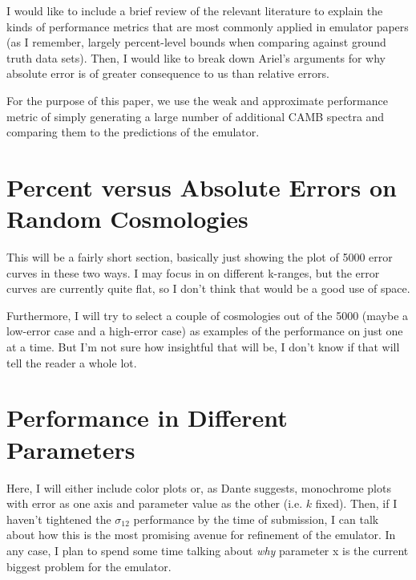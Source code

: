 I would like to include a brief review of the relevant literature to explain the kinds of performance metrics that are most commonly applied in emulator papers (as I remember, largely percent-level bounds when comparing against ground truth data sets). Then, I would like to break down Ariel's arguments for why absolute error is of greater consequence to us than relative errors.

For the purpose of this paper, we use the weak and approximate performance metric of simply generating a large number of additional CAMB spectra and comparing them to the predictions of the emulator.

\section{Percent versus Absolute Errors on Random Cosmologies}

This will be a fairly short section, basically just showing the plot of 5000 error curves in these two ways. I may focus in on different k-ranges, but the error curves are currently quite flat, so I don't think that would be a good use of space.

Furthermore, I will try to select a couple of cosmologies out of the 5000 (maybe a low-error case and a high-error case) as examples of the performance on just one at a time. But I'm not sure how insightful that will be, I don't know if that will tell the reader a whole lot.

\section{Performance in Different Parameters}

Here, I will either include color plots or, as Dante suggests, monochrome plots with error as one axis and parameter value as the other (i.e. $k$ fixed). Then, if I haven't tightened the $\sigma_{12}$ performance by the time of submission, I can talk about how this is the most promising avenue for refinement of the emulator. In any case, I plan to spend some time talking about \textit{why} parameter x is the current biggest problem for the emulator. 
